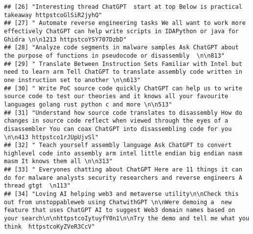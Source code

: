 \documentclass[
]{article}
\begin{document}
\begin{verbatim}
## [26] "Interesting thread ChatGPT  start at top Below is practical takeaway httpstcoGlSiR2jyhQ"                                                                                                                                                                                                                           
## [27] " Automate reverse engineering tasks We all want to work more effectively ChatGPT can help write scripts in IDAPython or java for Ghidra \n\n1213 httpstcoYSY707DzbD"                                                                                                                                               
## [28] "Analyze code segments in malware samples Ask ChatGPT about the purpose of functions in pseudocode or disassembly  \n\n813"                                                                                                                                                                                         
## [29] " Translate Between Instruction Sets Familiar with Intel but need to learn arm Tell ChatGPT to translate assembly code written in one instruction set to another \n\n613"                                                                                                                                           
## [30] " Write PoC source code quickly ChatGPT can help us to write source code to test our theories and it knows all your favourite languages golang rust python c and more \n\n513"                                                                                                                                      
## [31] "Understand how source code translates to disassembly How do changes in source code reflect when viewed through the eyes of a disassembler You can coax ChatGPT into disassembling code for you  \n\n413 httpstco1rJUpUjvSl"                                                                                        
## [32] " Teach yourself assembly language Ask ChatGPT to convert highlevel code into assembly arm intel little endian big endian nasm masm It knows them all \n\n313"                                                                                                                                                      
## [33] " Everyones chatting about ChatGPT Here are 11 things it can do for malware analysts security researchers and reverse engineers A thread gtgt  \n113"                                                                                                                                                               
## [34] "Loving AI helping web3 and metaverse utility\n\nCheck this out from unstoppableweb using ChatwithGPT \n\nWere demoing a  new feature that uses ChatGPT AI to suggest Web3 domain names based on your search\n\nhttpstcoIytuyfY0n1\n\nTry the demo and tell me what you think  httpstcoKyZVeR3CcV"                  

\end{verbatim}
\end{document}
